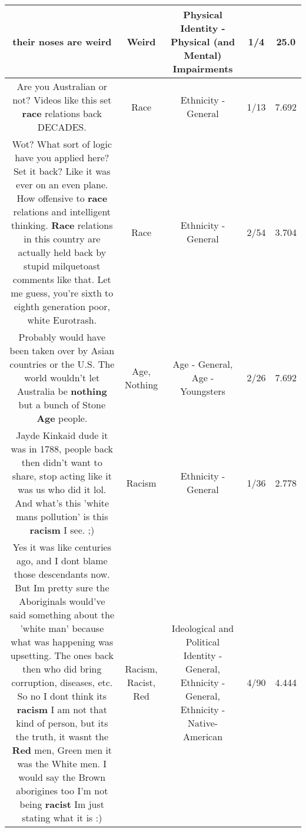 \documentclass[11pt]{article}
\newlength\mylength
\begin{document}
\begin{center}
\begin{longtable}{|C{.65\mylength}|C{.30\mylength}|C{.12\mylength}|C{.12\mylength}|C{.12\mylength}|}
  \small their noses are weird\normalsize   & Weird & Physical Identity - Physical (and Mental) Impairments & 1/4 & 25.0 \\  \hline
  \small Are you Australian or not? Videos like this set \textbf{race} relations back DECADES.\normalsize   & Race & Ethnicity - General & 1/13 & 7.692 \\  \hline
  \small Wot? What sort of logic have you applied here? Set it back? Like it was ever on an even plane. How offensive to \textbf{race} relations and intelligent thinking. \textbf{Race} relations in this country are actually held back by stupid milquetoast comments like that.  Let me guess, you're sixth to eighth generation poor, white Eurotrash.\normalsize   & Race & Ethnicity - General & 2/54 & 3.704 \\  \hline
  \small Probably would have been taken over by Asian countries or the U.S. The world wouldn't let Australia be \textbf{nothing} but a bunch of Stone \textbf{Age} people.\normalsize   & Age, Nothing & Age - General, Age - Youngsters & 2/26 & 7.692 \\  \hline
  \small Jayde Kinkaid dude it was in 1788, people back then didn't want to share, stop acting like it was us who did it lol. And what's this 'white mans pollution' is this \textbf{racism} I see. ;)\normalsize   & Racism & Ethnicity - General & 1/36 & 2.778 \\  \hline
  \small Yes it was like centuries ago, and I dont blame those descendants now. But Im pretty sure the Aboriginals would've said something about the 'white man' because what was happening was upsetting. The ones back then who did bring corruption, diseases, etc. So no I dont think its \textbf{racism} I am not that kind of person, but its the truth, it wasnt the \textbf{R\textbf{ed}} men, Green men it was the White men. I would say the Brown aborigines too I'm not being \textbf{racist} Im just stating what it is :)\normalsize   & Racism, Racist, Red &  Ideological and Political Identity - General, Ethnicity - General, Ethnicity - Native-American & 4/90 & 4.444 \\  \hline

\end{longtable}
\end{center}
\end{document}
